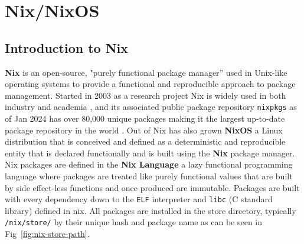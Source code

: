 \section{Nix/NixOS}
\subsection{Introduction to Nix}


\textbf{Nix} \cite{dolstra2004nix} is an open-source, "purely functional package manager” used in Unix-like operating systems to provide a functional and reproducible approach to package management. Started in 2003 as a research project Nix \cite{dolstra2006purely} is widely used in both industry \cite{NixCommunityNixOSWiki} and academia \cite{10.1145/3152493.3152556} \cite{https://doi.org/10.1002/qua.26872} \cite{LHCbNix}, and its associated public package repository \texttt{nixpkgs} \cite{NixPkgs} as of Jan 2024 has over 80,000 unique packages making it the largest up-to-date package repository in the world  \cite{Marakasov_2024}. Out of Nix has also grown \textbf{NixOS} \cite{10.1145/1411204.1411255} a Linux distribution that is conceived and defined as a deterministic and reproducible entity that is declared functionally and is built using the \textbf{Nix} package manager. \\


Nix packages are defined in the \textbf{Nix Language} a lazy functional programming language where packages are treated like purely functional values that are built by side effect-less functions and once produced are immutable. Packages are built with every dependency down to the \texttt{ELF} interpreter and \texttt{libc} (C standard library) defined in nix. All packages are installed in the store directory, typically \texttt{/nix/store/} by their unique hash and package name as can be seen in Fig~\ref{fig:nix-store-path}.

